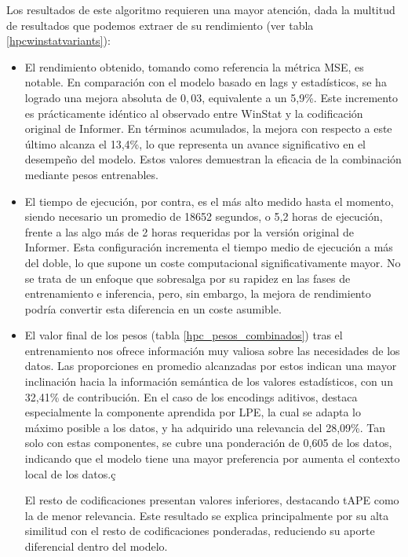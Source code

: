 Los resultados de este algoritmo requieren una mayor atención, dada la multitud de resultados que podemos extraer de su rendimiento (ver tabla \ref{hpcwinstatvariants}):

\begin{itemize}
	 \item El rendimiento obtenido, tomando como referencia la métrica MSE, es notable. En comparación con el modelo basado en lags y estadísticos, se ha logrado una mejora absoluta de $0,03$, equivalente a un 5,9\%. Este incremento es prácticamente idéntico al observado entre {WinStat} y la codificación original de {Informer}. En términos acumulados, la mejora con respecto a este último alcanza el 13,4\%, lo que representa un avance significativo en el desempeño del modelo. Estos valores demuestran la eficacia de la combinación mediante pesos entrenables.
	\item El tiempo de ejecución, por contra, es el más alto medido hasta el momento, siendo necesario un promedio de 18652 segundos, o 5,2 horas de ejecución, frente a las algo más de 2 horas requeridas por la versión original de Informer. Esta configuración incrementa el tiempo medio de ejecución a más del doble, lo que supone un coste computacional significativamente mayor. No se trata de un enfoque que sobresalga por su rapidez en las fases de entrenamiento e inferencia, pero, sin embargo, la mejora de rendimiento podría convertir esta diferencia en un coste asumible.
	\item El valor final de los pesos (tabla \ref{hpc_pesos_combinados}) tras el entrenamiento nos ofrece información muy valiosa sobre las necesidades de los datos. Las proporciones en promedio alcanzadas por estos indican una mayor inclinación hacia la información semántica de los valores estadísticos, con un 32,41\% de contribución. En el caso de los encodings aditivos, destaca especialmente la componente aprendida por LPE, la cual se adapta lo máximo posible a los datos, y ha adquirido una relevancia del 28,09\%. Tan solo con estas componentes, se cubre una ponderación de 0,605 de los datos, indicando que el modelo tiene una mayor preferencia por aumenta el contexto local de los datos.ç
	
	 El resto de codificaciones presentan valores inferiores, destacando tAPE como la de menor relevancia. Este resultado se explica principalmente por su alta similitud con el resto de codificaciones ponderadas, reduciendo su aporte diferencial dentro del modelo.
	
\end{itemize}

